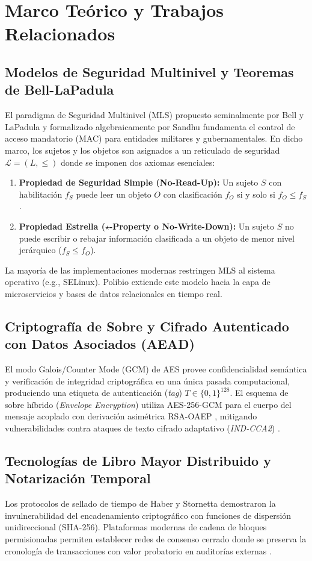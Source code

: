 \documentclass[journal,10pt]{IEEEtran}
\begin{document}
\section{Marco Teórico y Trabajos Relacionados}
\subsection{Modelos de Seguridad Multinivel y Teoremas de Bell-LaPadula}
El paradigma de Seguridad Multinivel (MLS) propuesto seminalmente por Bell y LaPadula \cite{bell1976secure} y formalizado algebraicamente por Sandhu \cite{sandhu1993lattice} fundamenta el control de acceso mandatorio (MAC) para entidades militares y gubernamentales. En dicho marco, los sujetos y los objetos son asignados a un reticulado de seguridad $\mathcal{L} = (L, \le)$ donde se imponen dos axiomas esenciales:
\begin{enumerate}
    \item \textbf{Propiedad de Seguridad Simple (No-Read-Up):} Un sujeto $S$ con habilitación $f_S$ puede leer un objeto $O$ con clasificación $f_O$ si y solo si $f_O \le f_S$.
    \item \textbf{Propiedad Estrella ($\star$-Property o No-Write-Down):} Un sujeto $S$ no puede escribir o rebajar información clasificada a un objeto de menor nivel jerárquico ($f_S \le f_O$).
\end{enumerate}
La mayoría de las implementaciones modernas restringen MLS al sistema operativo (e.g., SELinux). Polibio extiende este modelo hacia la capa de microservicios y bases de datos relacionales en tiempo real.

\subsection{Criptografía de Sobre y Cifrado Autenticado con Datos Asociados (AEAD)}
El modo Galois/Counter Mode (GCM) de AES \cite{nist_sp800_38d_gcm} provee confidencialidad semántica y verificación de integridad criptográfica en una única pasada computacional, produciendo una etiqueta de autenticación (\textit{tag}) $T \in \{0, 1\}^{128}$. El esquema de sobre híbrido (\textit{Envelope Encryption}) utiliza AES-256-GCM para el cuerpo del mensaje acoplado con derivación asimétrica RSA-OAEP \cite{rfc8017_rsa_oaep}, mitigando vulnerabilidades contra ataques de texto cifrado adaptativo (\textit{IND-CCA2}) \cite{boneh2023graduate}.

\subsection{Tecnologías de Libro Mayor Distribuido y Notarización Temporal}
Los protocolos de sellado de tiempo de Haber y Stornetta \cite{haber1991how} demostraron la invulnerabilidad del encadenamiento criptográfico con funciones de dispersión unidireccional (SHA-256). Plataformas modernas de cadena de bloques permisionadas \cite{androulaki2018hyperledger, xu2019architecture} permiten establecer redes de consenso cerrado donde se preserva la cronología de transacciones con valor probatorio en auditorías externas \cite{gaetani2019blockchain}.
\end{document}
